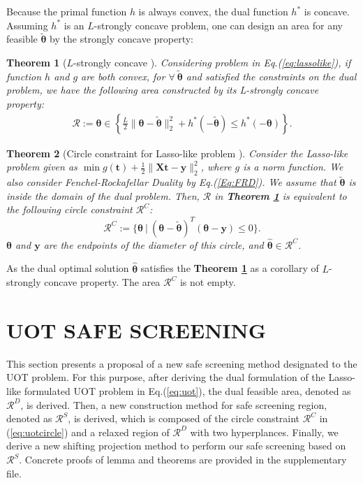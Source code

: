 \documentclass[twoside]{article}
\theoremstyle{plain}
\newtheorem{thm}{Theorem}
\newcommand{\mat}[1]{\mathbf{#1}}
\renewcommand{\vec}[1]{\bm{#1}}
\begin{document}
Because the primal function $h$ is always convex, the dual function $h^*$ is concave. Assuming $h^*$ is an $L$-strongly concave problem, one can design an area for any feasible $\tilde{\vec{\theta}}$ by the strongly concave property:

\begin{thm}[$L$-strongly concave {\citep[Theorem 5]{Yamada_NIPS_2021}}]
\label{Thm:circle}
Considering problem in Eq.(\ref{eq:lassolike}), if function $h$ and $g$ are both convex, for $\forall \ \tilde{\vec{\theta}}$ and satisfied the constraints on the dual problem, we have the following area constructed by its L-strongly concave property:
$$
\begin{aligned}
\mathcal{R}:=\vec{\theta} \in \left\{\frac{L}{2}\|\vec{\theta}-\tilde{\vec{\theta}}\|_2^2+h^*(-\tilde{\vec{\theta}}) \leq h^*(-\vec{\theta})\right\}.
\end{aligned}
$$
\end{thm}

\begin{thm}[Circle constraint for Lasso-like problem {\citep[Theorem 8]{Yamada_NIPS_2021}}]
\label{Thm:CC}
Consider the Lasso-like problem given as $\min g(\vec{t}) + \frac{1}{2}\|\mat{X} \vec{t}-\vec{y}\|_2^2$, where $g$ is a norm function. We also consider Fenchel-Rockafellar Duality by Eq.(\ref{Eq:FRD}). We assume that $\tilde{\vec{\theta}}$ is inside the domain of the dual problem. Then, $\mathcal{R}$ in {\bf Theorem \ref{Thm:circle}} is equivalent to the following circle constraint $\mathcal{R}^{C}$:
\begin{equation}
\mathcal{R}^{C} :=\{\vec\theta\ |\ (\vec{\theta}-\tilde{\vec{\theta}})^T(\vec{\theta}-\vec{y})\leq 0\}.
\label{eq:uotcircle}
\end{equation}
$\vec\theta$ and $\vec y$ are the endpoints of the diameter of this circle, and $\hat{ \vec\theta} \in \mathcal{R}^{C}$.
\end{thm}
As the dual optimal solution $\hat{\vec{\theta}}$ satisfies the {\bf Theorem \ref{Thm:circle}} as a corollary of $L$-strongly concave property. The area $\mathcal{R}^{C}$ is not empty. 



\section{UOT SAFE SCREENING}
\label{sec:pro}

This section presents a proposal of a new safe screening method designated to the UOT problem. 
For this purpose, after deriving the dual formulation of the Lasso-like formulated UOT problem in Eq.(\ref{eq:uot}), the dual feasible area, denoted as $\mathcal{R}^D$, is derived. Then, a new construction method for safe screening region, denoted as $\mathcal{R}^S$, is derived, which is composed of the circle constraint $\mathcal{R}^C$ in (\ref{eq:uotcircle}) and a relaxed region of $\mathcal{R}^D$ with two hyperplances. Finally, we derive a new shifting projection method to perform our safe screening based on $\mathcal{R}^S$. Concrete proofs of lemma and theorems are provided in the supplementary file.
\end{document}
